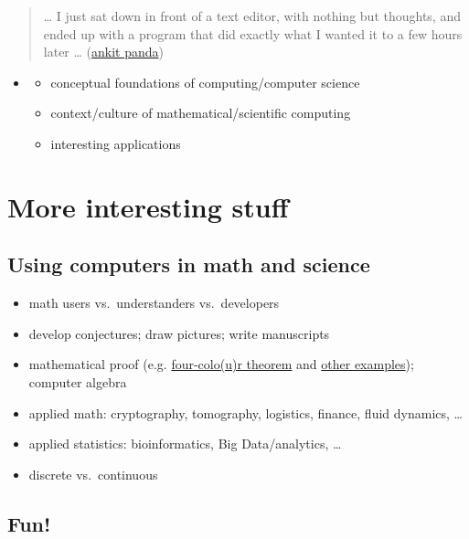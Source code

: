 \documentclass[]{tufte-handout}
\begin{document}
\begin{quote}
\ldots{} I just sat down in front of a text editor, with nothing but
thoughts, and ended up with a program that did exactly what I wanted it
to a few hours later \ldots{}
(\href{http://www.ankitpanda.com/pythonicity/}{ankit panda})
\end{quote}

\begin{itemize}
\item
  \begin{itemize}
  \itemsep1pt\parskip0pt
  \item
    conceptual foundations of computing/computer science
  \item
    context/culture of mathematical/scientific computing
  \item
    interesting applications
  \end{itemize}
\end{itemize}

\section{More interesting stuff}\label{more-interesting-stuff}

\subsection{Using computers in math and
science}\label{using-computers-in-math-and-science}

\begin{itemize}
\itemsep1pt\parskip0pt
\item
  math users vs.~understanders vs.~developers
\item
  develop conjectures; draw pictures; write manuscripts
\item
  mathematical proof (e.g.
  \href{http://en.wikipedia.org/wiki/Four_color_theorem}{four-colo(u)r
  theorem} and
  \href{http://math.stackexchange.com/questions/1084230/what-are-some-theorems-that-currently-only-have-computer-assisted-proofs}{other
  examples}); computer algebra
\item
  applied math: cryptography, tomography, logistics, finance, fluid
  dynamics, \ldots{}
\item
  applied statistics: bioinformatics, Big Data/analytics, \ldots{}
\item
  discrete vs.~continuous
\end{itemize}

\subsection{Fun!}\label{fun}
\end{document}
